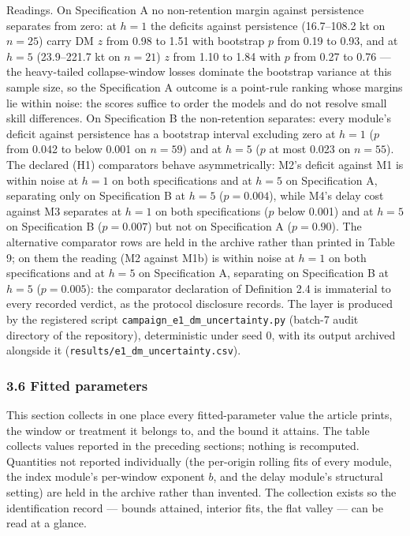 \documentclass[11pt]{article}
\begin{document}
Readings. On Specification A no non-retention margin against persistence
separates from zero: at \(h=1\) the deficits against persistence (16.7--108.2 kt on
\(n=25\)) carry DM \(z\) from 0.98 to 1.51 with bootstrap \(p\) from
0.19 to 0.93, and at \(h=5\) (23.9--221.7 kt on \(n=21\)) \(z\) from
1.10 to 1.84 with \(p\) from 0.27 to 0.76 --- the heavy-tailed
collapse-window losses dominate the bootstrap variance at this sample
size, so the Specification A outcome is a point-rule ranking whose
margins lie within noise: the scores suffice to order the models and do
not resolve small skill differences. On Specification B the non-retention
separates: every module's deficit against persistence has a bootstrap interval excluding zero at
\(h=1\) (\(p\) from 0.042 to below 0.001 on \(n=59\)) and at \(h=5\)
(\(p\) at most 0.023 on \(n=55\)). The declared (H1) comparators behave
asymmetrically: M2's deficit against M1 is within noise at \(h=1\) on
both specifications and at \(h=5\) on Specification A, separating only
on Specification B at \(h=5\) (\(p=0.004\)), while M4's delay cost
against M3 separates at \(h=1\) on both specifications (\(p\) below
0.001) and at \(h=5\) on Specification B (\(p=0.007\)) but not on
Specification A (\(p=0.90\)). The alternative comparator rows are held in the
archive rather than printed in Table 9; on them the reading (M2
against M1b) is within noise at \(h=1\) on both specifications and at
\(h=5\) on Specification A, separating on Specification B at \(h=5\)
(\(p=0.005\)): the comparator declaration of Definition 2.4 is
immaterial to every recorded verdict, as the protocol disclosure
records. The layer is produced by the registered script
\texttt{campaign\_e1\_dm\_uncertainty.py} (batch-7 audit directory of
the repository), deterministic under seed 0, with its output archived
alongside it (\texttt{results/e1\_dm\_uncertainty.csv}).

\subsubsection{3.6 Fitted parameters}\label{fitted-parameters}

This section collects in one place every fitted-parameter value the
article prints, the window or treatment it belongs to, and the bound it
attains. The table collects values reported in the preceding
sections; nothing is recomputed. Quantities not reported individually
(the per-origin rolling fits of every module, the index module's
per-window exponent \(b\), and the delay module's structural setting)
are held in the archive rather than
invented. The collection exists so the identification record --- bounds
attained, interior fits, the flat valley --- can be read at a glance.
\end{document}
